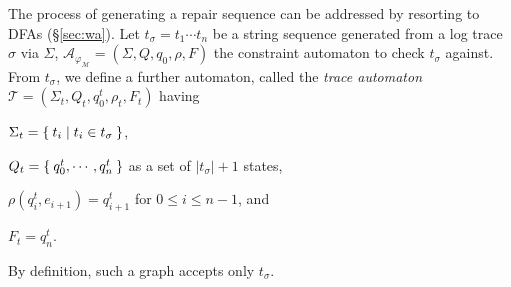 The process of generating a repair sequence can be addressed by resorting to DFAs (\S\ref{sec:wa}). Let $t_\sigma=t_1\cdots t_n$ be a string sequence generated from a log trace $\sigma$ via $\Sigma$, $\mathcal{A}_{\varphi_{\mathcal{M}}}=(\Sigma,Q,q_0,\rho,F)$ the constraint automaton to check $t_\sigma$ against. From $t_\sigma$, we define a further automaton, called the \textit{trace automaton} $\mathcal{T}=(\Sigma_t,Q_t,q_0^t,\rho_t,F_t)$ having \begin{enumerate*}[label=\emph{\alph*})]
	\item $\Sigma_t=\Set{t_i|t_i\in t_\sigma}$,
	\item $Q_t=\Set{q_0^t,\cdots,q_n^t}$ as a set of $|t_\sigma|+1$ states,
	\item $\rho(q_i^t,e_{i+1})=q_{i+1}^t$ for $0\leq i\leq n-1$,
	and
	\item $F_t={q_n^t}$.
\end{enumerate*} By definition, such a graph accepts only $t_\sigma$.


